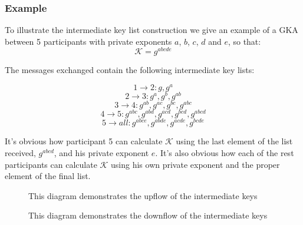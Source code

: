 \subsubsection{Example}
To illustrate the intermediate key list construction we give an example of a GKA between 5 participants with private exponents $a$, $b$, $c$, $d$ and $e$, so that:
\[
\mathcal{K} = g^{abcde}
\]

The messages exchanged contain the following intermediate key lists:

\[ 1 \rightarrow 2: g, g^a \]
\[ 2 \rightarrow 3: g^a, g^b, g^{ab} \]
\[ 3 \rightarrow 4: g^{ab}, g^{ac}, g^{bc}, g^{abc} \]
\[ 4 \rightarrow 5: g^{abc}, g^{abd}, g^{acd}, g^{bcd}, g^{abcd} \]
\[ 5 \rightarrow all: g^{abce}, g^{abde}, g^{acde}, g^{bcde} \]

It's obvious how participant 5 can calculate $\mathcal{K}$ using the last element of the list received, $g^{abcd}$, and his private exponent $e$. It's also obvious how each of the rest participants can calculate $\mathcal{K}$ using his own private exponent and the proper element of the final list.


\begin{figure}[H]
  \begin{minipage}{0.49\textwidth}
    \caption{This diagram demonstrates the upflow of the intermediate keys}    
    \label{figures:gka_upflow}
  \end{minipage}
  \begin{minipage}{0.49\textwidth}
    \caption{This diagram demonstrates the downflow of the intermediate keys}
    \label{figures:gka_downflow}
  \end{minipage}
\end{figure}

